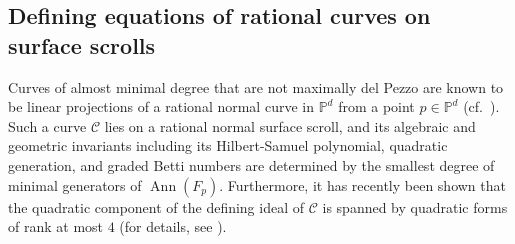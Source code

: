 \documentclass[a4paper, 11pt]{amsart}
\numberwithin{theorem}{section}
\theoremstyle{definition}
\numberwithin{equation}{section}
\begin{document}
\subsection{Defining equations of rational curves on surface scrolls}
Curves of almost minimal degree that are not maximally del Pezzo are known to be linear projections of a rational normal curve in $\mathbb{P}^d$ from a point $p \in \mathbb{P}^d$ (cf.~\cite{MR2274517}). 
Such a curve $\mathcal{C}$ lies on a rational normal surface scroll, and its algebraic and geometric invariants including its Hilbert-Samuel polynomial, quadratic generation, and graded Betti numbers are determined by the smallest degree of minimal generators of $\operatorname{Ann}(F_p)$. 
Furthermore, it has recently been shown that the quadratic component of the defining ideal of $\mathcal{C}$ is spanned by quadratic forms of rank at most $4$ (for details, see \cite{MR4496651, MR5047032}).
\end{document}

